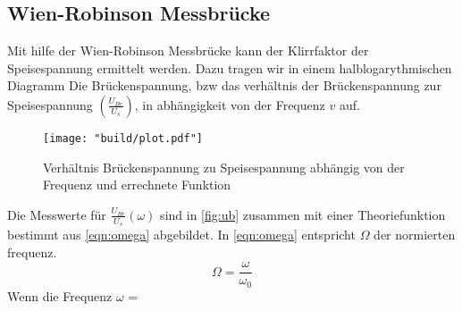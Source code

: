 
\subsection{Wien-Robinson Messbrücke}
Mit hilfe der Wien-Robinson Messbrücke kann der Klirrfaktor der Speisespannung ermittelt 
werden. Dazu tragen wir in einem halblogarythmischen Diagramm Die Brückenspannung, bzw das 
verhältnis der Brückenspannung zur Speisespannung $(\frac{U_{Br}}{U_s})$, in abhängigkeit von 
der Frequenz $v$ auf.
\begin{figure}
       \caption{Verhältnis Brückenspannung zu Speisespannung abhängig von der Frequenz und errechnete Funktion}
       \label{fig:ub}
       \centering
       \texttt{[image: "build/plot.pdf"]}
\end{figure}
Die Messwerte für $\frac{U_{Br}}{U_s}\left(\omega\right)$ sind in \autoref{fig:ub} zusammen mit einer Theoriefunktion
bestimmt aus \autoref{eqn:omega} abgebildet.
In \autoref{eqn:omega} entspricht $\Omega$ der normierten frequenz.
\begin{equation}
       \Omega = \frac{\omega}{\omega_0} 
\end{equation}
Wenn die Frequenz $\omega$ =
